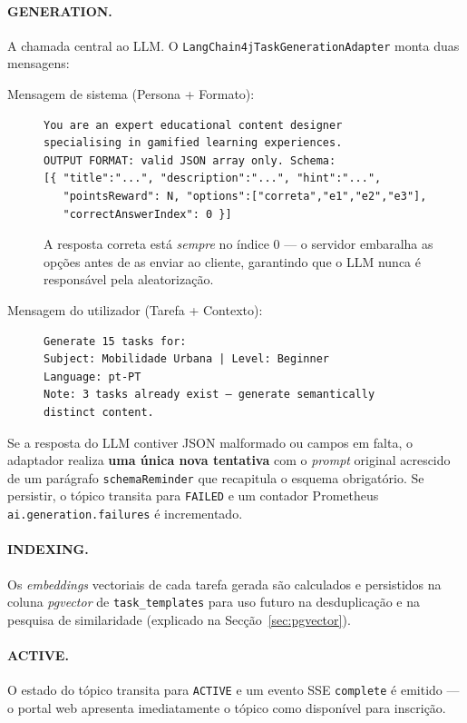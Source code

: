 \paragraph{GENERATION.}
A chamada central ao LLM.
O \texttt{LangChain4jTaskGenerationAdapter} monta duas mensagens:

\begin{description}
  \item[Mensagem de sistema (Persona + Formato):]
\begin{verbatim}
You are an expert educational content designer
specialising in gamified learning experiences.
OUTPUT FORMAT: valid JSON array only. Schema:
[{ "title":"...", "description":"...", "hint":"...",
   "pointsReward": N, "options":["correta","e1","e2","e3"],
   "correctAnswerIndex": 0 }]
\end{verbatim}
  A resposta correta está \emph{sempre} no índice 0 — o servidor
  embaralha as opções antes de as enviar ao cliente, garantindo que
  o LLM nunca é responsável pela aleatorização.

  \item[Mensagem do utilizador (Tarefa + Contexto):]
\begin{verbatim}
Generate 15 tasks for:
Subject: Mobilidade Urbana | Level: Beginner
Language: pt-PT
Note: 3 tasks already exist — generate semantically
distinct content.
\end{verbatim}
\end{description}

Se a resposta do LLM contiver JSON malformado ou campos em falta,
o adaptador realiza \textbf{uma única nova tentativa} com o
\textit{prompt} original acrescido de um parágrafo \texttt{schemaReminder}
que recapitula o esquema obrigatório.
Se persistir, o tópico transita para \texttt{FAILED} e um contador
Prometheus \texttt{ai.generation.failures} é incrementado.

\paragraph{INDEXING.}
Os \textit{embeddings} vectoriais de cada tarefa gerada são calculados
e persistidos na coluna \textit{pgvector} de \texttt{task\_templates}
para uso futuro na desduplicação e na pesquisa de similaridade
(explicado na Secção~\ref{sec:pgvector}).

\paragraph{ACTIVE.}
O estado do tópico transita para \texttt{ACTIVE} e um evento SSE
\texttt{complete} é emitido — o portal web apresenta imediatamente o
tópico como disponível para inscrição.

